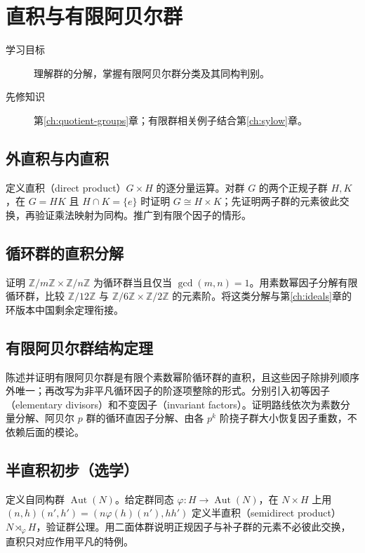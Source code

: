 \documentclass[UTF8,12pt,a4paper,fontset=fandol]{ctexbook}
\begin{document}
\chapter{直积与有限阿贝尔群}\label{ch:abelian}

\begin{description}
  \item[学习目标] 理解群的分解，掌握有限阿贝尔群分类及其同构判别。
  \item[先修知识] 第\ref{ch:quotient-groups}章；有限群相关例子结合第\ref{ch:sylow}章。
\end{description}

\section{外直积与内直积}
定义直积（direct product）$G\times H$ 的逐分量运算。对群 $G$ 的两个正规子群 $H,K$，在 $G=HK$ 且 $H\cap K=\{e\}$ 时证明 $G\cong H\times K$；先证明两子群的元素彼此交换，再验证乘法映射为同构。推广到有限个因子的情形。

\section{循环群的直积分解}
证明 $\mathbb Z/m\mathbb Z\times\mathbb Z/n\mathbb Z$ 为循环群当且仅当 $\gcd(m,n)=1$。用素数幂因子分解有限循环群，比较 $\mathbb Z/12\mathbb Z$ 与 $\mathbb Z/6\mathbb Z\times\mathbb Z/2\mathbb Z$ 的元素阶。将这类分解与第\ref{ch:ideals}章的环版本中国剩余定理衔接。

\section{有限阿贝尔群结构定理}
陈述并证明有限阿贝尔群是有限个素数幂阶循环群的直积，且这些因子除排列顺序外唯一；再改写为非平凡循环因子的阶逐项整除的形式。分别引入初等因子（elementary divisors）和不变因子（invariant factors）。证明路线依次为素数分量分解、阿贝尔 $p$ 群的循环直因子分解、由各 $p^k$ 阶挠子群大小恢复因子重数，不依赖后面的模论。

\section{半直积初步（选学）}
定义自同构群 $\operatorname{Aut}(N)$。给定群同态 $\varphi:H\to\operatorname{Aut}(N)$，在 $N\times H$ 上用 $(n,h)(n',h')=(n\varphi(h)(n'),hh')$ 定义半直积（semidirect product）$N\rtimes_\varphi H$，验证群公理。用二面体群说明正规因子与补子群的元素不必彼此交换，直积只对应作用平凡的特例。
\end{document}
